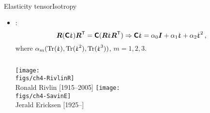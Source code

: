 \begin{frame}{Elasticity tensor}{Isotropy}

\begin{itemize}
\item {}:
\begin{displaymath}
\rotation(\tenselas\strain)\rotation^\itr=\tenselas(\rotation\strain\rotation^\itr)\imply\tenselas\strain=\alpha_0\Id+\alpha_1\strain+\alpha_2\strain^2\,,
\end{displaymath}
where $\alpha_m(\trace(\strain),\trace(\strain^2),\trace(\strain^3))$, $m=1,2,3$.
\vskip20pt
\begin{columns}[t]
\centering\texttt{[image: \\figs/ch4-RivlinR]}\\
{\scriptsize Ronald Rivlin [1915--2005]}
\centering\texttt{[image: \\figs/ch4-SavinE]}\\
{\scriptsize Jerald Ericksen [1925--]}
\end{columns}
\end{itemize}

\end{frame}

